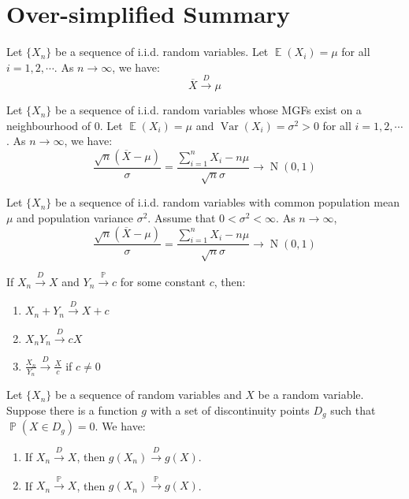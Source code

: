 \documentclass{huhtakm-template-book-v2}
\DeclareMathOperator{\prob}{\mathbb{P}}
\DeclareMathOperator{\E}{\mathbb{E}}
\DeclareMathOperator{\Var}{Var}
\DeclareMathOperator{\N}{N}
\begin{document}
\appendix
\renewcommand{\thechapter}{\Alph{chapter}}
\chapter{Over-simplified Summary}
\begin{thm}
	Let $\{X_{n}\}$ be a sequence of i.i.d. random variables. Let $\E(X_{i})=\mu$ for all $i=1,2,\cdots$. As $n\to\infty$, we have:
	\begin{equation*}
		\overline{X}\xrightarrow{D}\mu
	\end{equation*}
\end{thm}
\begin{thm}
	Let $\{X_{n}\}$ be a sequence of i.i.d. random variables whose MGFs exist on a neighbourhood of $0$. Let $\E(X_{i})=\mu$ and $\Var(X_{i})=\sigma^{2}>0$ for all $i=1,2,\cdots$. As $n\to\infty$, we have:
	\begin{equation*}
		\frac{\sqrt{n}(\overline{X}-\mu)}{\sigma}=\frac{\sum_{i=1}^{n}X_{i}-n\mu}{\sqrt{n}\sigma}\to\N(0,1)
	\end{equation*}
\end{thm}
\begin{thm} 
	Let $\{X_{n}\}$ be a sequence of i.i.d. random variables with common population mean $\mu$ and population variance $\sigma^{2}$. Assume that $0<\sigma^{2}<\infty$. As $n\to\infty$,
	\begin{equation*}
		\frac{\sqrt{n}(\overline{X}-\mu)}{\sigma}=\frac{\sum_{i=1}^{n}X_{i}-n\mu}{\sqrt{n}\sigma}\to\N(0,1)
	\end{equation*}
\end{thm}
\begin{thm}
	If $X_{n}\xrightarrow{D}X$ and $Y_{n}\xrightarrow{\prob}c$ for some constant $c$, then:
	\begin{enumerate}
		\item $X_{n}+Y_{n}\xrightarrow{D}X+c$
		\item $X_{n}Y_{n}\xrightarrow{D}cX$
		\item $\frac{X_{n}}{Y_{n}}\xrightarrow{D}\frac{X}{c}$ if $c\neq 0$
	\end{enumerate}
\end{thm}
\begin{thm}
	Let $\{X_{n}\}$ be a sequence of random variables and $X$ be a random variable. Suppose there is a function $g$ with a set of discontinuity points $D_{g}$ such that $\prob(X\in D_{g})=0$. We have:
	\begin{enumerate}
		\item If $X_{n}\xrightarrow{D}X$, then $g(X_{n})\xrightarrow{D}g(X)$.
		\item If $X_{n}\xrightarrow{\prob}X$, then $g(X_{n})\xrightarrow{\prob}g(X)$.
	\end{enumerate}
\end{thm}
\end{document}
